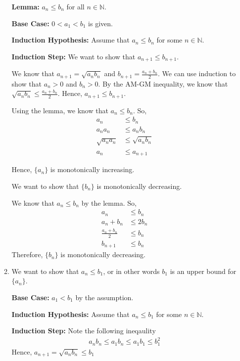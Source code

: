 \documentclass[12pt]{article}
\begin{document}
\begin{enumerate}[start=1,label={\bfseries Problem \arabic*:},leftmargin=1in]
\begin{enumerate}
        \textbf{Lemma:} $a_{n} \leq b_{n}$ for all $n \in \mathbb{N}$.
        
        \textbf{Base Case:} $0 < a_{1} < b_{1}$ is given. 
    
        \textbf{Induction Hypothesis:} Assume that $a_{n} \leq b_{n}$ for some $n \in \mathbb{N}$.
    
        \textbf{Induction Step:} We want to show that $a_{n+1} \leq b_{n+1}$.
    
        We know that $a_{n+1} = \sqrt{a_{n}b_{n}}$ and $b_{n+1} = \frac{a_{n} + b_{n}}{2}$.
        We can use induction to show that $a_{n} > 0$ and $b_{n} > 0$.  
        By the AM-GM inequality, we know that $\sqrt{a_{n}b_{n}} \leq \frac{a_{n} + b_{n}}{2}$. Hence, $a_{n+1} \leq b_{n+1}$.
        
        Using the lemma, we know that $a_{n} \leq b_{n}$. So, 
        \begin{align*}
            a_{n} &\leq b_{n}\\
            a_{n}a_{n} &\leq a_{n}b_{n}\\ 
            \sqrt{a_{n}a_{n}} &\leq \sqrt{a_{n}b_{n}}\\ 
            a_{n} &\leq a_{n+1}
        \end{align*}
    
        Hence, $\{a_{n}\}$ is monotonically increasing. 
    
        We want to show that $\{ b_{n} \}$ is monotonically decreasing. 
    
        We know that $a_{n} \leq b_{n}$ by the lemma. So, 
        \begin{align*}
            a_{n} &\leq b_{n} \\ 
            a_{n} + b_{n} &\leq 2b_{n} \\ 
            \frac{a_{n} + b_{n}}{2} &\leq b_{n} \\ 
            b_{n+1} &\leq b_{n}
        \end{align*}
        Therefore, $\{b_{n} \}$ is monotonically decreasing. 
    
        \item We want to show that $a_{n} \leq b_{1}$, or in other words $b_{1}$ is an upper bound for $\{a_{n}\}$.
        
        \textbf{Base Case:} $a_{1} < b_{1}$ by the assumption. 
    
        \textbf{Induction Hypothesis:} Assume that $a_{n} \leq b_{1}$ for some $n \in \mathbb{N}$.
    
        \textbf{Induction Step:} Note the following ineqaulity
        \begin{align*}
            a_{n}b_{n} \leq a_{1}b_{n} \leq a_{1}b_{1} \leq b_{1}^2
        \end{align*}
        Hence, $a_{n+1}=\sqrt{a_{n}b_{n}}\leq b_{1}$
    

\end{enumerate}
\end{enumerate}
\end{document}
